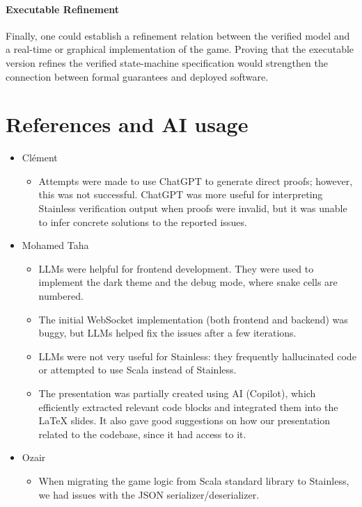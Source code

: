 \documentclass[letterpaper, 11pt]{article}
\begin{document}
\paragraph{Executable Refinement}
Finally, one could establish a refinement relation between the verified model and a real-time or
graphical implementation of the game. Proving that the executable version refines the verified
state-machine specification would strengthen the connection between formal guarantees and deployed
software.


\section{References and AI usage}
\begin{itemize}
    \item Clément
        \begin{itemize}
            \item Attempts were made to use ChatGPT to generate direct proofs; however, this was not successful. ChatGPT was more useful for interpreting Stainless verification output when proofs were invalid, but it was unable to infer concrete solutions to the reported issues.
        \end{itemize}
    \item Mohamed Taha
    \begin{itemize}
        \item LLMs were helpful for frontend development. They were used to implement the dark theme and the debug mode, where snake cells are numbered.
        \item The initial WebSocket implementation (both frontend and backend) was buggy, but LLMs helped fix the issues after a few iterations.
        \item LLMs were not very useful for Stainless: they frequently hallucinated code or attempted to use Scala instead of Stainless.
        \item The presentation was partially created using AI (Copilot), which efficiently extracted relevant code blocks and integrated them into the \LaTeX{} slides. It also gave good suggestions on how our presentation related to the codebase, since it had access to it.
    \end{itemize}
    \item Ozair
        \begin{itemize}
            \item When migrating the game logic from Scala standard library to Stainless, we had
                issues with the JSON serializer/deserializer.

\end{itemize}
\end{itemize}
\end{document}
